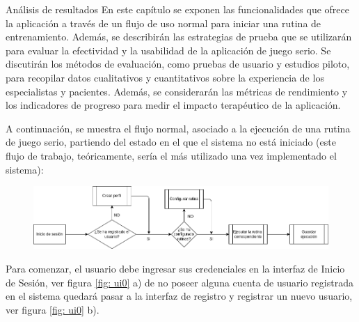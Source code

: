 \begin{thesischapter}{3} {Análisis de resultados}
    En este capítulo se exponen las funcionalidades que ofrece la aplicación a través de un flujo de uso 
    normal para iniciar una rutina de entrenamiento.  Además, se describirán las estrategias de prueba que se utilizarán para evaluar la efectividad y la 
    usabilidad de la aplicación de juego serio. Se discutirán los métodos de evaluación, como pruebas de usuario 
    y estudios piloto, para recopilar datos cualitativos y cuantitativos sobre la experiencia de los especialistas y pacientes. 
    Además, se considerarán las métricas de rendimiento y los indicadores de progreso para medir el impacto terapéutico de la 
    aplicación.


    A continuación, se muestra el flujo normal, asociado a la ejecución de una rutina
    de juego serio, partiendo del estado en el que el sistema no está iniciado (este flujo de trabajo,
    teóricamente, sería el más utilizado una vez implementado el sistema):

    \begin{figure}[ht]
        \centering
        \includegraphics[scale=0.5]{images/diagram-flow.png}
        \caption{}
        \label{fig: diagram-flow}
    \end{figure}
    
    \vspace{10pt}
    Para comenzar, el usuario debe ingresar sus credenciales en la interfaz de Inicio de Sesión, ver figura \ref{fig: ui0} a)
    de no poseer alguna cuenta de usuario registrada en el sistema quedará pasar a la interfaz de registro  
    y registrar un nuevo usuario, ver figura \ref{fig: ui0} b).


\end{thesischapter}
